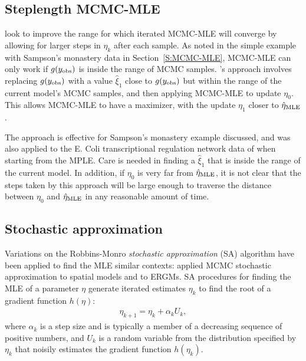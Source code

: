 \subsection{Steplength MCMC-MLE} \label{S:Hummel}
\citet{Hummel} look to improve the range for which iterated MCMC-MLE will converge by
allowing for larger steps in $\eta_k$ after each sample.  As noted in the 
simple example with 
Sampson's monastery data in Section~\ref{S:MCMC-MLE}, MCMC-MLE can only work 
if $g(y_{\text{obs}})$ is inside the range of MCMC samples.  
\citeauthor{Hummel}'s approach involves 
replacing $g(y_{\text{obs}})$ with a value $\hat{\xi}_1$ close to $g(y_{\text{obs}})$ but within
the range of the current model's MCMC samples,
and then applying MCMC-MLE to update $\eta_0$.  This allows MCMC-MLE to have
a maximizer, with the update $\eta_1$ closer to $\hat{\eta}_{\textrm{MLE}}$.

The approach is effective for Sampson's monastery example discussed, and was also applied
to the E. Coli transcriptional regulation network data of \citet{Shen-Orr} when 
starting from the MPLE.  Care is needed in finding a $\hat{\xi}_1$ that is inside
the range of the current model. In addition, if $\eta_0$ is very far from $\hat{\eta}_{\textrm{MLE}}$, it is 
not clear that the steps taken by this approach will be large enough to traverse
the distance between $\eta_0$ and $\hat{\eta}_{\textrm{MLE}}$ in any reasonable amount of time.



%

    
\subsection{Stochastic approximation}

Variations on the Robbins-Monro \emph{stochastic approximation} (SA) algorithm 
\citep{Robbins-Monro} have been applied to find the MLE similar contexts: 
\citet{Younes:1988,Younes:1989,Moyeed:1991,Gu:2001}
applied MCMC stochastic approximation to spatial models and \citet{Snijders:2002} to 
ERGMs.
SA procedures for finding the MLE of a parameter $\eta$ generate iterated estimates 
$\eta_k$ to find the 
root of a gradient function $h(\eta)$:
\begin{align} \label{E:eta SA update}
	\eta_{k+1} = \eta_k + \alpha_k U_k,
\end{align}
where $\alpha_k$ is a step size and is typically a member of a decreasing sequence of 
positive numbers, and $U_k$ is a 
random variable from the distribution specified by $\eta_k$ that noisily estimates the 
gradient function $h(\eta_k)$.  

